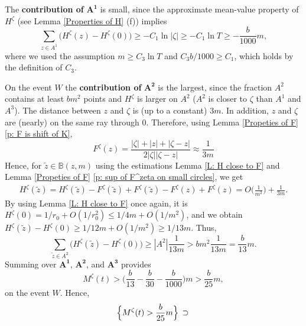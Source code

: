 \documentclass[11pt]{article}
\makeatletter
\renewenvironment{proof}[1][\proofname]{
   \par\pushQED{\qed}\normalfont
   \topsep6\p@\@plus6\p@\relax
   \trivlist\item[\hskip\labelsep\bfseries#1\@addpunct{.}]
   \ignorespaces
}{
   \popQED\endtrivlist\@endpefalse
}
\numberwithin{equation}{section}
\def\MZT{M^{\zeta}(t)}
\makeatother
\begin{document}
\begin{proof}[Proof of Lemma \ref{Early Points Imply Late Points}]
  The \textbf{contribution of} $\boldsymbol{A^1}$ is small, since 
  the approximate mean-value property of 
  $H^{\zeta}$ (see Lemma \ref{Properties of H} (f)) implies
  $$
    \sum_{z \in A^1} 
      \big( H^{\zeta}(z) - H^{\zeta}(0) \big) 
    \geq -C_1 \ln |\zeta| 
    \geq -C_1 \ln T 
    \geq -\frac{b}{1000}m,
  $$
  where we used the assumption $m \geq C_3 \ln T$ and $C_3 b/1000 \geq C_1$, 
  which holds by the definition of $C_3$.

  On the event $W$ the \textbf{contribution of} $\boldsymbol{A^2}$ is 
  the largest, since the fraction $A^2$ contains at least $bm^2$ points and 
  $H^{\zeta}$ is larger on $A^2$ ($A^2$ is closer to $\zeta$ than $A^1$ and $A^3$).    
  The distance between $z$ and $\zeta$ is (up to a constant) $3m$. 
  In addition, $z$ and $\zeta$ are (nearly) on the 
  same ray through $0$. Therefore, 
  using Lemma \ref{Propeties of F} \ref{p: F is shift of K}, 
  \begin{equation}\nonumber
    F^{\zeta}(z) = 
    \frac{|\zeta| +|z| + |\zeta - z|}
      {2|\zeta| |\zeta - z|} 
    \approx \frac{1}{3m}
  \end{equation} 
  Hence, for $\tilde{z} \in \mathbb{B}(z,m)$ 
  using the estimations Lemma \ref{L: H close to F} and 
  Lemma \ref{Propeties of F} \ref{p: sup of F^zeta on small circles}, we get 
  \begin{equation}\nonumber
  \begin{split}
    H^{\zeta}(\tilde{z}) 
    = H^{\zeta}(\tilde{z}) - F^{\zeta}(\tilde{z})
      + F^{\zeta}(\tilde{z}) - F^{\zeta}(z) 
      + F^{\zeta}(z)
    = O\Big( \frac{1}{m^2} \Big) + \frac{1}{3m}.
  \end{split}
  \end{equation}
  By using Lemma \ref{L: H close to F} once again, 
  it is $H^{\zeta}(0) = 1/r_0 + O(1/r_0^2) \leq 1/4m + O(1/m^2)$, 
  and we obtain 
  $H^{\zeta}(\tilde{z}) - H^{\zeta}(0) \geq  1/12m + O(1/m^2) \geq 1/13 m$. 
  Thus, 
  $$
  \sum_{\tilde{z} \in A^2} 
  \big(H^{\zeta}(\tilde{z}) - 
    H^{\zeta}(0) \big) 
  \geq |A^2| \frac{1}{13m} 
  > bm^2 \frac{1}{13m} 
  = \frac{b}{13} m.
  $$
  Summing over $\boldsymbol{A^1, \, A^2}$, and $\boldsymbol{A^3}$  provides 
  \begin{equation}\nonumber
    \MZT > 
    \Big( \frac{b}{13} - 
    \frac{b}{30} - \frac{b}{1000} \Big) m 
    > \frac{b}{25}m,
  \end{equation}
  on the event $W$. Hence,
  \begin{equation}\label{eq: M^zeta superset of}
    \Big{\{} \MZT > \frac{b}{25}m \Big{\}} \, \supset \, 

\end{equation}
\end{proof}
\end{document}
